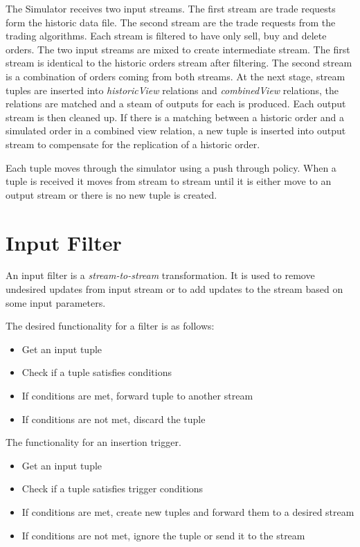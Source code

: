 \documentclass{article}
\begin{document}
The Simulator receives two input streams. The first stream are trade requests form the historic data file. The second stream are the trade requests from the trading algorithms. Each stream is filtered to have only sell, buy and delete orders. The two input streams are mixed to create intermediate stream. The first stream is identical to the historic orders stream after filtering. The second stream is a combination of orders coming from both streams. At the next stage, stream tuples are inserted into  \emph{historicView} relations and \emph{combinedView} relations, the relations are matched and a steam of outputs for each is produced. Each output stream is then cleaned up. If there is a matching between a historic order and a simulated order in a combined view relation, a new tuple is inserted into output stream to compensate for the replication of a historic order.

Each tuple moves through the simulator using a push through policy. When a tuple is received it moves from stream to stream until it is either move to an output stream or there is no new tuple is created.

\section{Input Filter}

An input filter is a \emph{stream-to-stream} transformation. It is used to remove undesired updates from input stream or to add updates to the stream based on some input parameters.

The desired functionality for a filter is as follows:

\begin{itemize}
    \item Get an input tuple
    \item Check if a tuple satisfies conditions
    \item If conditions are met, forward tuple to another stream
    \item If conditions are not met, discard the tuple
\end{itemize}

The functionality for an insertion trigger.

\begin{itemize}
    \item Get an input tuple
    \item Check if a tuple satisfies trigger conditions
    \item If conditions are met, create new tuples and forward them to a desired stream
    \item If conditions are not met, ignore the tuple or send it to the stream
\end{itemize}
\end{document}
